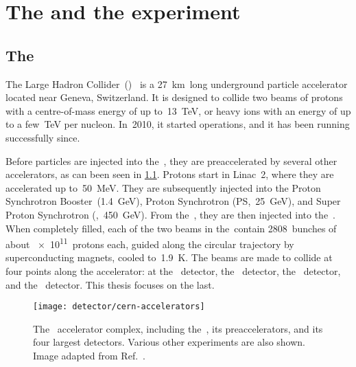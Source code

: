 \chapter{The \lhc and the \lhcb experiment}
\label{chp:detector}

\vspace*{\fill}
\minitoc

\clearpage
\section{The \lhc}
\label{sec:LHC}

The Large Hadron Collider~(\lhc)~\cite{Evans:1129806} is a \SI{27}{\km}~long underground particle accelerator located near Geneva, Switzerland.
It is designed to collide two beams of protons with a centre-of-mass energy of up to~\SI{13}{\TeV}, or heavy ions with an energy of up to a few~\si{\TeV} per nucleon.
In~2010, it started operations, and it has been running successfully since.

Before particles are injected into the~\lhc, they are preaccelerated by several other accelerators, as can been seen in \cref{fig:detector_LHC}.
Protons start in Linac~2, where they are accelerated up to~\SI{50}{\MeV}.
They are subsequently injected into the Proton Synchrotron Booster~(\SI{1.4}{\GeV}), Proton Synchrotron (PS,~\SI{25}{\GeV}), and Super Proton Synchrotron (\sps,~\SI{450}{\GeV}).
From the~\sps, they are then injected into the~\lhc.
When completely filled, each of the two beams in the~\lhc contain \num{2808}~bunches of about \num{e11}~protons each, guided along the circular trajectory by superconducting magnets, cooled to~\SI{1.9}{\kelvin}.
The beams are made to collide at four points along the accelerator: at the \atlas~detector, the \alice~detector, the \cms~detector, and the \lhcb~detector.
This thesis focuses on the last.
%
\begin{figure}[htb] \centerfloat
    \hspace*{-.5cm}
    \texttt{[image: detector/cern-accelerators]}
    \caption{
        The \cern~accelerator complex, including the~\lhc, its preaccelerators, and its four largest detectors.
        Various other experiments are also shown.
        Image adapted from Ref.~\cite{Mobs:2197559}.}
    \label{fig:detector_LHC}
\end{figure}

